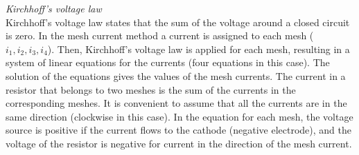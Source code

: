 \begin{enumerate}
{\begin{minipage}{\linewidth}
\begin{minipage}{6mm}
\end{minipage}
\textit{Kirchhoff's voltage law} \\
Kirchhoff's voltage law states that the sum of the voltage around a closed circuit is zero. In the mesh current method a current is assigned to each mesh ($i_1, i_2, i_3, i_4$). Then, Kirchhoff's voltage law is applied for each mesh, resulting in a system of linear equations for the currents (four equations in this case). The solution of the equations gives the values of the mesh currents. The current in a resistor that belongs to two meshes is the sum of the currents in the corresponding meshes. It is convenient to assume that all the currents are in the same direction (clockwise in this case). In the equation for each mesh, the voltage source is positive if the current flows to the cathode (negative electrode), and the voltage of the resistor is negative for current in the direction of the mesh current.
\end{minipage}%
}\\
\addtolength{\parindent}{4mm}

\newpage

\end{enumerate}
